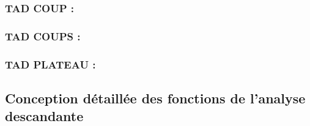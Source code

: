 \documentclass{article}
\begin{document}
\subsubsection{TAD COUP :}


\subsubsection{TAD COUPS :}


\subsubsection{TAD PLATEAU :}


\subsection{Conception détaillée des fonctions de l'analyse descandante}

\end{document}
